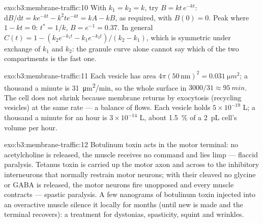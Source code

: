 \begin{solution}{exo:b3:membrane-traffic:10}
With $k_{1} = k_{2} = k$, try $B = kt\,e^{-kt}$: $\mathrm{d}B/\mathrm{d}t
= k e^{-kt} - k^{2}t e^{-kt} = kA - kB$, as required, with $B(0) = 0$.
Peak where $1 - kt = 0$: $t^{*} = 1/k$, $B = e^{-1} = 0.37$. In general
$C(t) = 1 - (k_{2}e^{-k_{1}t} - k_{1}e^{-k_{2}t})/(k_{2} - k_{1})$,
which is symmetric under exchange of $k_{1}$ and $k_{2}$: the granule
curve alone cannot say which of the two compartments is the fast one.
\end{solution}

\begin{solution}{exo:b3:membrane-traffic:11}
Each vesicle has area $4\pi(50\,\text{nm})^{2} = \qty{0.031}{\micro
m^2}$; a thousand a minute is \qty{31}{\micro m^2/min}, so the whole
surface in $3000/31 \approx \qty{95}{min}$. The cell does not shrink
because membrane returns by exocytosis (recycling vesicles) at the same
rate --- a balance of flows. Each vesicle holds $5\times 10^{-19}$ L; a
thousand a minute for an hour is $3\times 10^{-14}$ L, about
\qty{1.5}{\%} of a \qty{2}{pL} cell's volume per hour.
\end{solution}

\begin{solution}{exo:b3:membrane-traffic:12}
Botulinum toxin acts in the motor terminal: no acetylcholine is
released, the muscle receives no command and lies limp --- flaccid
paralysis. Tetanus toxin is carried up the motor axon and across to
the inhibitory interneurons that normally restrain motor neurons; with
their  cleaved no glycine or GABA is released, the motor neurons
fire unopposed and every muscle contracts --- spastic paralysis. A
few nanograms of botulinum toxin injected into an overactive muscle
silence it locally for months (until new  is made and the terminal
recovers): a treatment for dystonias, spasticity, squint and wrinkles.
\end{solution}

